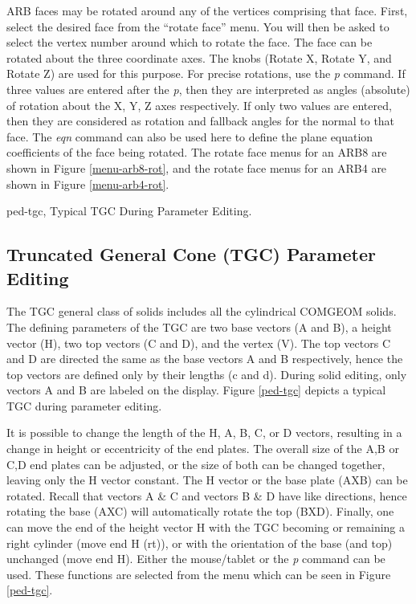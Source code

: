 ARB faces may be rotated around any of the vertices comprising that face.
First, select the desired face from the ``rotate face'' menu.  You will then
be asked to select the vertex number around which to rotate the face.
The face can be rotated about the three coordinate axes.  The knobs (Rotate X,
Rotate Y, and Rotate Z) are used for this purpose.  For precise rotations,
use the {\em p} command.  If three values are entered after the {\em p}, then
they are interpreted as angles (absolute) of rotation about the X, Y, Z axes
respectively.  If only two values are entered, then they are considered as
rotation and fallback angles for the normal to that face.  The {\em eqn}
command can also be used here to define the plane equation coefficients of
the face being rotated.
The rotate face menus for an ARB8 are shown
in Figure \ref{menu-arb8-rot}, and the rotate face menus for an ARB4
are shown in Figure \ref{menu-arb4-rot}.

\mfig ped-tgc, Typical TGC During Parameter Editing.
\subsection{Truncated General Cone (TGC) Parameter Editing}

The TGC general class of solids includes all the cylindrical COMGEOM solids.
The defining parameters of the TGC are two base vectors (A and B), a height
vector (H), two top vectors (C and D), and the vertex (V).
The top vectors C and D are directed the same as the base vectors A and
B respectively,
hence the top vectors are defined only by their lengths (c and d).
During solid editing, only vectors A and B are
labeled on the display.
Figure \ref{ped-tgc} depicts a typical TGC during parameter editing.

It is possible to change the length of the H, A, B, C, or D
vectors, resulting in a change in height or eccentricity of the
end plates.  The overall size of the A,B or C,D end plates can
be adjusted, or the size of both can be changed together, leaving
only the H vector constant.
The H vector or the base plate (AXB) can be rotated.
Recall that vectors A \& C and vectors B \& D have like directions, hence
rotating the base (AXC) will automatically rotate the top (BXD).
Finally, one can move the end of the height vector H
with the TGC becoming or remaining
a right cylinder (move end H (rt)),
or with the orientation of the base (and top)
unchanged (move end H).
Either the mouse/tablet or the {\em p} command can be used.
These functions are selected from the menu which can be seen
in Figure \ref{ped-tgc}.

